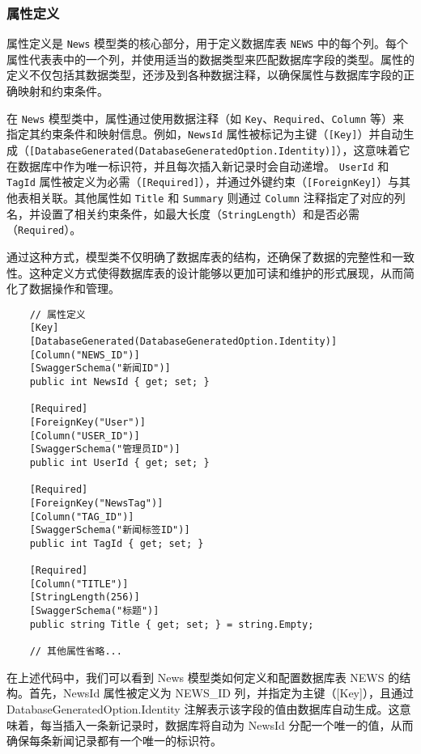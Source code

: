 \subsubsection{属性定义}

属性定义是 \texttt{News} 模型类的核心部分，用于定义数据库表 \texttt{NEWS} 中的每个列。每个属性代表表中的一个列，并使用适当的数据类型来匹配数据库字段的类型。属性的定义不仅包括其数据类型，还涉及到各种数据注释，以确保属性与数据库字段的正确映射和约束条件。

在 \texttt{News} 模型类中，属性通过使用数据注释（如 \texttt{Key}、\texttt{Required}、\texttt{Column} 等）来指定其约束条件和映射信息。例如，\texttt{NewsId} 属性被标记为主键（\texttt{[Key]}）并自动生成（\texttt{[DatabaseGenerated(DatabaseGeneratedOption.Identity)]}），这意味着它在数据库中作为唯一标识符，并且每次插入新记录时会自动递增。 \texttt{UserId} 和 \texttt{TagId} 属性被定义为必需（\texttt{[Required]}），并通过外键约束（\texttt{[ForeignKey]}）与其他表相关联。其他属性如 \texttt{Title} 和 \texttt{Summary} 则通过 \texttt{Column} 注释指定了对应的列名，并设置了相关约束条件，如最大长度（\texttt{StringLength}）和是否必需（\texttt{Required}）。

通过这种方式，模型类不仅明确了数据库表的结构，还确保了数据的完整性和一致性。这种定义方式使得数据库表的设计能够以更加可读和维护的形式展现，从而简化了数据操作和管理。

\begin{verbatim}
	// 属性定义
	[Key]
	[DatabaseGenerated(DatabaseGeneratedOption.Identity)]
	[Column("NEWS_ID")]
	[SwaggerSchema("新闻ID")]
	public int NewsId { get; set; }
	
	[Required]
	[ForeignKey("User")]
	[Column("USER_ID")]
	[SwaggerSchema("管理员ID")]
	public int UserId { get; set; }
	
	[Required]
	[ForeignKey("NewsTag")]
	[Column("TAG_ID")]
	[SwaggerSchema("新闻标签ID")]
	public int TagId { get; set; }
	
	[Required]
	[Column("TITLE")]
	[StringLength(256)]
	[SwaggerSchema("标题")]
	public string Title { get; set; } = string.Empty;
	
	// 其他属性省略...
\end{verbatim}

在上述代码中，我们可以看到 News 模型类如何定义和配置数据库表 NEWS 的结构。首先，NewsId 属性被定义为 NEWS\_ID 列，并指定为主键（[Key]），且通过 DatabaseGeneratedOption.Identity 注解表示该字段的值由数据库自动生成。这意味着，每当插入一条新记录时，数据库将自动为 NewsId 分配一个唯一的值，从而确保每条新闻记录都有一个唯一的标识符。

